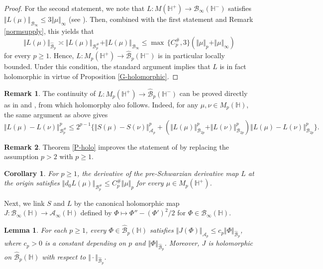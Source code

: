 \documentclass[amstex,12pt,reqno]{amsart}
\newtheorem{lemma}[theorem]{Lemma}
\newtheorem{corollary}[theorem]{Corollary}
\theoremstyle{definition}
\newtheorem{remark}{Remark}
\begin{document}
\begin{proof}
For the second statement, we note that
$L:M(\mathbb H^+) \to {\mathcal B}_\infty(\mathbb H^-)$ satisfies
$\Vert L(\mu) \Vert_{\mathcal B_\infty} \leq 3 \Vert \mu \Vert_\infty$
(see \cite[Proposition 5.3]{GH}).
Then, combined with the first statement and Remark \ref{normsupply}, this yields that
$$
\Vert L(\mu) \Vert_{\widehat{\mathcal B}_p} \asymp \Vert L(\mu) \Vert_{{\mathcal B}_p^{\#}}
+\Vert L(\mu) \Vert_{{\mathcal B}_\infty}
\leq \max\,\{C_p^{\#},3\}(\Vert \mu \Vert_p+\Vert \mu \Vert_\infty)
$$
for every $p \geq 1$.
Hence, $L:M_p(\mathbb H^+) \to \widehat{\mathcal B}_p(\mathbb H^-)$ is in particular locally bounded.
Under this condition, the standard argument implies that $L$ is in fact holomorphic
in virtue of Proposition \ref{G-holomorphic}.
\end{proof}

\begin{remark}
The continuity of $L:M_p(\mathbb H^+) \to \widehat{\mathcal B}_p(\mathbb H^-)$
can be proved directly as in \cite[Theorem 2.4]{Sh} and \cite[Theorem 2.4]{TS}, from which holomorphy also follows. Indeed,
for any $\mu, \nu \in M_p(\mathbb H)$, the same argument as above gives
\begin{equation}
\Vert L(\mu)-L(\nu) \Vert_{\mathcal B_p^{\#}}^p
\leq
2^{p-1}\{\Vert S(\mu)-S(\nu) \Vert_{\mathcal A_p}^p+
(\Vert L(\mu) \Vert_{\mathcal B_{2p}}^p+\Vert L(\nu) \Vert_{\mathcal B_{2p}}^p)\Vert L(\mu)-L(\nu) \Vert_{\mathcal B_{2p}}^p\}.
\end{equation}
\end{remark}

\begin{remark}
Theorem \ref{P-holo} improves the statement of \cite[Theorem 6.10]{WM-4} by replacing the assumption $p>2$
with $p \geq 1$.
\end{remark}

\begin{corollary}
For $p \geq 1$, 
the derivative of the pre-Schwarzian derivative map $L$ at the origin
satisfies $\Vert d_{0}L(\mu) \Vert_{{\mathcal B}^{\#}_p} \leq C_p^{\#} \Vert \mu \Vert_p$ for
every $\mu \in M_p(\mathbb H^+)$.
\end{corollary}

Next, we link $S$ and $L$ by the canonical holomorphic map 
$J:{\mathcal B}_\infty(\mathbb H) \to \mathcal A_\infty(\mathbb H)$ 
defined by $\Phi \mapsto \Phi''-(\Phi')^2/2$ for $\Phi \in {\mathcal B}_\infty(\mathbb H)$.

\begin{lemma}\label{BtoA}
For each $p \geq 1$, every 
$\Phi \in \widehat{\mathcal B}_p(\mathbb H)$ satisfies
$\Vert J(\Phi) \Vert_{{\mathcal A}_p} \leq c_p\Vert \Phi \Vert_{\widehat{\mathcal B}_p}$,
where $c_p>0$ is a constant depending on $p$ and $\Vert \Phi \Vert_{\widehat{\mathcal B}_p}$.
Moreover, $J$ is holomorphic on $\widehat{\mathcal B}_p(\mathbb H)$ with respect to
$\Vert \cdot \Vert_{\widehat{\mathcal B}_p}$.

\end{lemma}
\end{document}
